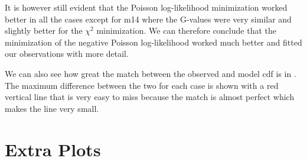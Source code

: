 \documentclass[a4paper,10pt]{article}
\begin{document}
It is however still evident that the Poisson log-likelihood minimization worked better in all the cases except for m14 where the G-values were very similar and slightly better for the $\chi^2$ minimization. We can therefore conclude that the minimization of the negative Poisson log-likelihood worked much better and fitted our observations with more detail. 

We can also see how great the match between the observed and model cdf is in . The maximum difference between the two for each case is shown with a red vertical line that is very easy to miss because the match is almost perfect which makes the line very small.  




\newpage

\appendix
\section{Extra Plots}
\label{chap:append}
\end{document}
